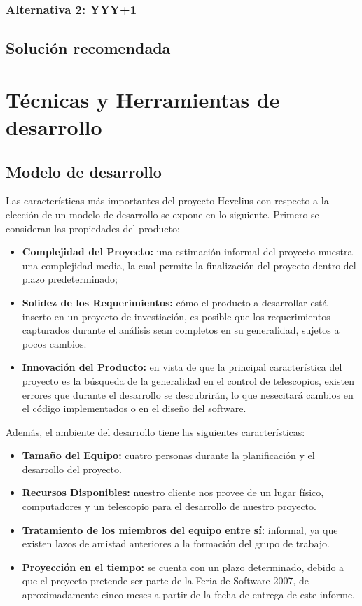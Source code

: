 \documentclass[letterpaper,spanish,10pt]{article}
\begin{document}
\subsubsection{Alternativa 2: YYY+1}



\subsection{Soluci\'on recomendada}



\newpage
\section{T\'ecnicas y Herramientas de desarrollo} %
\subsection{Modelo de desarrollo}
Las caracter\'isticas m\'as importantes del proyecto Hevelius con
respecto a la elecci\'on de un modelo de desarrollo se expone en lo
siguiente. Primero se consideran las propiedades del producto:

\begin{itemize}
\item \textbf{Complejidad del Proyecto:} una estimaci\'on informal del proyecto
  muestra una complejidad media, la cual permite la finalizaci\'on del
  proyecto dentro del plazo predeterminado;
\item \textbf{Solidez de los Requerimientos:} c\'omo el producto a
  desarrollar est\'a inserto en un proyecto de investiaci\'on, es posible que
  los requerimientos capturados durante el an\'alisis sean completos en su generalidad,
  sujetos a pocos cambios.
\item \textbf{Innovaci\'on del Producto:} en vista de que la principal caracter\'istica
  del proyecto es la b\'usqueda de la generalidad en el control de telescopios, existen 
  errores que durante el desarrollo se descubrir\'an, lo que nesecitar\'a cambios en el
  c\'odigo implementados o en el dise\~no del software.
\end{itemize}

Adem\'as, el ambiente del desarrollo tiene las siguientes caracter\'isticas:

\begin{itemize}
\item \textbf{Tama\~no del Equipo:} cuatro personas durante la planificaci\'on y el 
  desarrollo del proyecto.
\item \textbf{Recursos Disponibles:} nuestro cliente nos provee de un lugar f\'isico, 
  computadores y un telescopio para el desarrollo de nuestro proyecto.
\item \textbf{Tratamiento de los miembros del equipo entre s\'i:} informal, ya
  que existen lazos de amistad anteriores a la formaci\'on del grupo de trabajo.
\item \textbf{Proyecci\'on en el tiempo:} se cuenta con un plazo determinado,
  debido a que el proyecto pretende ser parte de la Feria de Software 2007, 
  de aproximadamente cinco meses a partir de la fecha de entrega de este informe.
\end{itemize}
\end{document}
